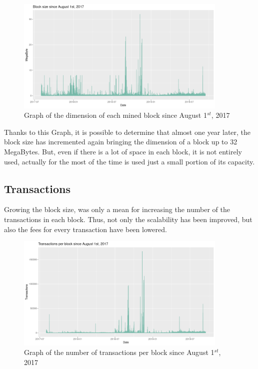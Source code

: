\begin{figure}[h]
    \centering
    \includegraphics[width = 0.9\textwidth]{blocksize2.png}
    \caption{Graph of the dimension of each mined block since August 1$^{st}$, 2017}
    \label{fig:request}
\end{figure}\pagebreak

Thanks to this Graph, it is possible to determine that almost one year later, the block 
size has incremented again bringing the dimension of a block up to 32 MegaBytes. 
But, even if there is a lot of space in each block, it is not entirely used, 
actually for the most of the time is used just a small portion of its capacity.

\subsection{Transactions}
Growing the block size, was only a mean for increasing the number of the transactions 
in each block. Thus, not only the scalability has been improved, but also the fees for every 
transaction have been lowered. 

\begin{figure}[h]
    \centering
    \includegraphics[width = 0.9\textwidth]{transactions1.png}
    \caption{Graph of the number of transactions per block since August 1$^{st}$, 2017}
    \label{fig:request}
\end{figure}

